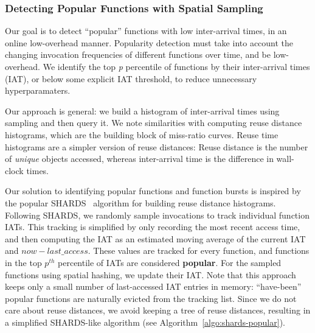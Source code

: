 \subsubsection{Detecting Popular Functions with Spatial Sampling}

Our goal is to detect ``popular'' functions with low inter-arrival times, in an online low-overhead manner.
%
Popularity detection must take into account the changing invocation frequencies of different functions over time, and be low-overhead.
We identify the top \textit{p} percentile of functions by their inter-arrival times (IAT), or below some explicit IAT threshold, to reduce unnecessary hyperparamaters. 

Our approach is general: we build a histogram of inter-arrival times using sampling and then query it. 
We note similarities with computing reuse distance histograms, which are the building block of miss-ratio curves. 
Reuse time histograms are a simpler version of reuse distances:
Reuse distance is the number of \emph{unique} objects accessed, whereas inter-arrival time is the difference in wall-clock times.



Our solution to identifying popular functions and function bursts is inspired by the popular SHARDS~\cite{shards} algorithm for building reuse distance histograms. 
%
Following SHARDS, we randomly sample invocations to track individual function IATs. 
This tracking is simplified by only recording the most recent access time, and then computing the IAT as an estimated moving average of the current IAT and  $now - last\_access$. 
These values are tracked for every function, and functions in the top $p^{th}$ percentile of IATs are considered \textbf{popular}.
%
For the sampled functions using spatial hashing, we update their IAT.
Note that this approach keeps only a small number of last-accessed IAT entries in memory: ``have-been'' popular functions are naturally evicted from the tracking list. 
Since we do not care about reuse distances, we avoid keeping a tree of reuse distances, resulting in a simplified SHARDS-like algorithm (see Algorithm~\ref{algo:shards-popular}). 



